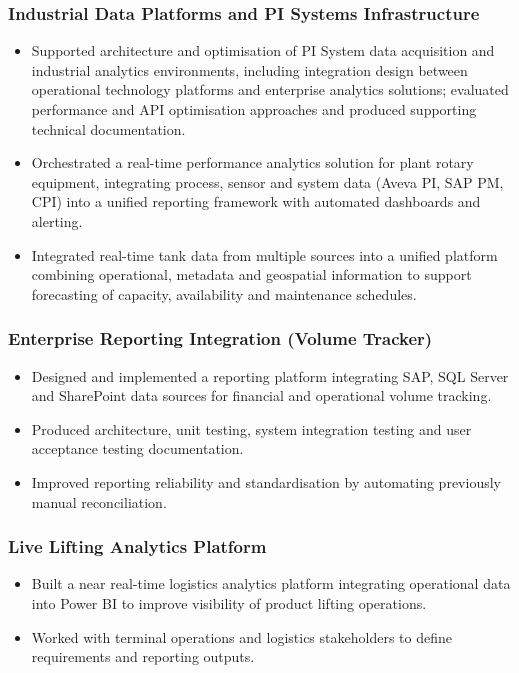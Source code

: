 \documentclass[11pt,a4paper]{article}
\begin{document}
\subsubsection*{Industrial Data Platforms and PI Systems Infrastructure}
\begin{itemize}
    \item Supported architecture and optimisation of PI System data
          acquisition and industrial analytics environments, including
          integration design between operational technology platforms and
          enterprise analytics solutions; evaluated performance and API
          optimisation approaches and produced supporting technical
          documentation.
    \item Orchestrated a real-time performance analytics solution for plant
          rotary equipment, integrating process, sensor and system data
          (Aveva PI, SAP PM, CPI) into a unified reporting framework with
          automated dashboards and alerting.
    \item Integrated real-time tank data from multiple sources into a unified
          platform combining operational, metadata and geospatial information
          to support forecasting of capacity, availability and maintenance
          schedules.
\end{itemize}

\subsubsection*{Enterprise Reporting Integration (Volume Tracker)}
\begin{itemize}
    \item Designed and implemented a reporting platform integrating SAP, SQL
          Server and SharePoint data sources for financial and operational
          volume tracking.
    \item Produced architecture, unit testing, system integration testing and
          user acceptance testing documentation.
    \item Improved reporting reliability and standardisation by automating
          previously manual reconciliation.
\end{itemize}

\subsubsection*{Live Lifting Analytics Platform}
\begin{itemize}
    \item Built a near real-time logistics analytics platform integrating
          operational data into Power BI to improve visibility of product
          lifting operations.
    \item Worked with terminal operations and logistics stakeholders to define
          requirements and reporting outputs.
\end{itemize}
\end{document}
